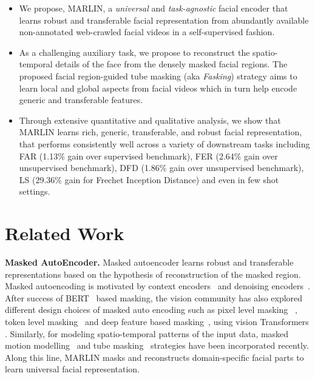 \documentclass[10pt,twocolumn,letterpaper]{article}
\begin{document}
\begin{itemize}[topsep=1pt,itemsep=0pt,partopsep=1ex,parsep=1ex,leftmargin=*]
    \item We propose, MARLIN, a \textit{universal} and \textit{task-agnostic} facial encoder that learns robust and transferable facial representation from abundantly available non-annotated web-crawled facial videos in a self-supervised fashion.
    
    \item As a challenging auxiliary task, we propose to reconstruct the spatio-temporal details of the face from the densely masked facial regions. The proposed facial region-guided tube masking (aka \textit{Fasking}) strategy aims to learn local and global aspects from facial videos which in turn help encode generic and transferable features. 
    
    \item Through extensive quantitative and qualitative analysis, we show that MARLIN learns rich, generic, transferable, and robust facial representation, that performs consistently well across a variety of downstream tasks including FAR (1.13\% gain over supervised benchmark), FER (2.64\% gain over unsupervised benchmark), DFD (1.86\% gain over unsupervised benchmark), LS (29.36\% gain for Frechet Inception Distance)
    and even in few shot settings.
    
\end{itemize}

\section{Related Work}

\noindent \textbf{Masked AutoEncoder.} Masked autoencoder learns robust and transferable representations based on the hypothesis of reconstruction of the masked region. Masked autoencoding is motivated by context encoders~\cite{pathakContext2016} and denoising encoders~\cite{vincentStacked2010}. After success of BERT~\cite{devlinBERT2019} based masking, the vision community has also explored different design choices of masked auto encoding such as pixel level masking ~\cite{chenGenerative2020,heMasked2022,xieSimMIM2022}, token level masking~\cite{el-noubyAre2021} and deep feature based masking~\cite{weiMasked2022,baevskidata2vec2022}, using vision Transformers \cite{khanTransformers2021, naseerIntriguing2021}. Similarly, for modeling spatio-temporal patterns of the input data, masked motion modelling~\cite{sunVideo2022} and tube masking~\cite{tongVideoMAE2022} strategies have been incorporated recently. Along this line, MARLIN masks and reconstructs domain-specific facial parts to learn universal facial representation.
\end{document}
